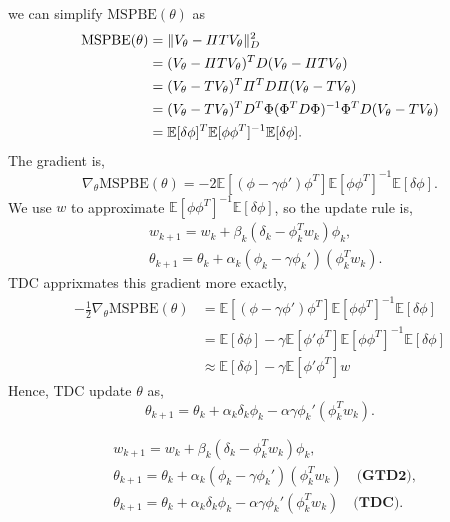 \documentclass[11pt,a4paper]{article}
\def\E{\mathbb{E}}
\def\Pi{\varPi}
\begin{document}
we can simplify $\mathrm{MSPBE}(\theta)$ as
\begin{equation}
\aligned 
\mathrm{MSPBE}(\theta) & = \|V_{\theta}-\Pi T V_{\theta}\|_D^2 \\ & = (V_{\theta} -\Pi T V_{\theta})^T D (V_{\theta} -\Pi T V_{\theta}) \\ & = (V_{\theta}-TV_{\theta})^T\Pi^TD\Pi(V_{\theta}-TV_{\theta}) \\ & = (V_{\theta}-TV_{\theta})^TD^T \Phi(\Phi^T D \Phi)^{-1} \Phi^T D(V_{\theta}-TV_{\theta}) \\ 
& = \E[\delta \phi]^T \E[\phi\phi^T]^{-1} \E[\delta\phi].
\endaligned 
\end{equation}
The gradient is,
\begin{equation}
\nabla_{\theta}\mathrm{MSPBE}(\theta) = -2\E[(\phi-\gamma\phi')\phi^T]\E[\phi\phi^T]^{-1}\E[\delta\phi].
\end{equation}
We use $w$ to approximate $\E[\phi\phi^T]^{-1}\E[\delta\phi]$, so the update rule is,
\begin{align}
& w_{k+1} = w_k + \beta_k(\delta_k - \phi_k^Tw_k)\phi_k, \\ 
& \theta_{k+1} = \theta_k + \alpha_k(\phi_k-\gamma\phi_k')(\phi_k^Tw_k).
\end{align}
TDC apprixmates this gradient more exactly,
\begin{align}
-\frac{1}{2}\nabla_{\theta}\mathrm{MSPBE}(\theta) & =\E[(\phi-\gamma\phi')\phi^T]\E[\phi\phi^T]^{-1}\E[\delta\phi] \\ 
& = \E[\delta\phi]-\gamma \E[\phi'\phi^T]\E[\phi\phi^T]^{-1}\E[\delta\phi] \\ 
& \approx  \E[\delta\phi] - \gamma \E[\phi'\phi^T]w
\end{align}
Hence, TDC update $\theta$ as,
\begin{equation}
\theta_{k+1} = \theta_k + \alpha_k\delta_k\phi_k - \alpha \gamma \phi_k'(\phi_k^Tw_k).
\end{equation}

\begin{tcolorbox}[title=Gradient Temporal Diffierence]
\begin{align}
& w_{k+1} = w_k + \beta_k(\delta_k - \phi_k^Tw_k)\phi_k, \\ 
& \theta_{k+1} = \theta_k + \alpha_k(\phi_k-\gamma\phi_k')(\phi_k^Tw_k)\quad \textbf{(GTD2)}, \\ 
& \theta_{k+1} = \theta_k + \alpha_k\delta_k\phi_k - \alpha \gamma \phi_k'(\phi_k^Tw_k) \quad \textbf{(TDC)}.
\end{align}
\end{tcolorbox}
\end{document}
